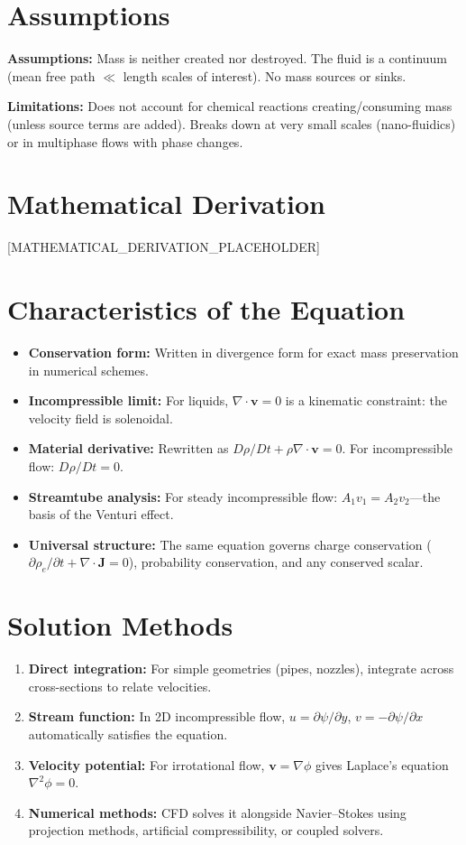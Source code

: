 \documentclass[11pt,openright]{book}
\begin{document}
\section*{Assumptions}

\textbf{Assumptions:} Mass is neither created nor destroyed. The fluid is a continuum (mean free path $\ll$ length scales of interest). No mass sources or sinks.


\textbf{Limitations:} Does not account for chemical reactions creating/consuming mass (unless source terms are added). Breaks down at very small scales (nano-fluidics) or in multiphase flows with phase changes.


\section*{Mathematical Derivation}

[MATHEMATICAL_DERIVATION_PLACEHOLDER]

\section*{Characteristics of the Equation}

\begin{itemize}
\item \textbf{Conservation form:} Written in divergence form for exact mass preservation in numerical schemes.
\item \textbf{Incompressible limit:} For liquids, $\nabla \cdot \mathbf{v} = 0$ is a kinematic constraint: the velocity field is solenoidal.
\item \textbf{Material derivative:} Rewritten as $D\rho/Dt + \rho \nabla \cdot \mathbf{v} = 0$. For incompressible flow: $D\rho/Dt = 0$.
\item \textbf{Streamtube analysis:} For steady incompressible flow: $A_1 v_1 = A_2 v_2$---the basis of the Venturi effect.
\item \textbf{Universal structure:} The same equation governs charge conservation ($\partial \rho_e / \partial t + \nabla \cdot \mathbf{J} = 0$), probability conservation, and any conserved scalar.
\end{itemize}
\section*{Solution Methods}

\begin{enumerate}
\item \textbf{Direct integration:} For simple geometries (pipes, nozzles), integrate across cross-sections to relate velocities.
\item \textbf{Stream function:} In 2D incompressible flow, $u = \partial\psi/\partial y$, $v = -\partial\psi/\partial x$ automatically satisfies the equation.
\item \textbf{Velocity potential:} For irrotational flow, $\mathbf{v} = \nabla\phi$ gives Laplace's equation $\nabla^2 \phi = 0$.
\item \textbf{Numerical methods:} CFD solves it alongside Navier--Stokes using projection methods, artificial compressibility, or coupled solvers.
\end{enumerate}
\end{document}
